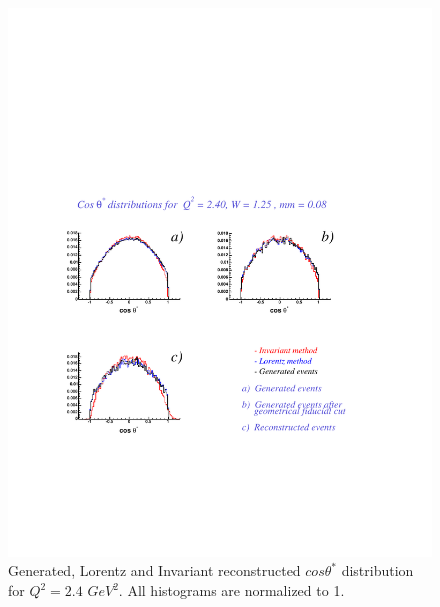 \begin{figure}[h]
 \begin{center}
  \includegraphics[width = 12cm, bb = 60 140 540 540]{appendix/img/ctheta_q22.40_W1.25_mm0.08}
  \caption{Generated, Lorentz and Invariant reconstructed $cos\theta^*$ distribution for $Q^2=2.4$ $GeV^2$.
           All histograms are normalized to 1.}
 \end{center}
\end{figure} 

